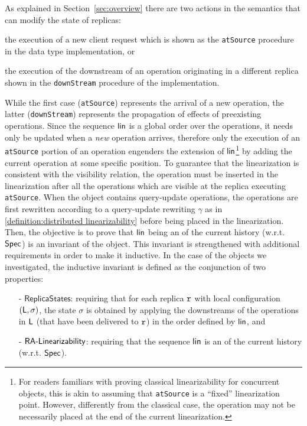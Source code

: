 As explained in Section~\ref{sec:overview} there are two actions in the
semantics that can modify the state of replicas:
\begin{inparaenum}
\item the execution of a new client request which is shown as the
  \lstinline|atSource| procedure in the data type implementation, or
\item the execution of the downstream of an operation originating in a
  different replica shown in the \lstinline|downStream| procedure of
  the implementation.
\end{inparaenum}
%
While the first case (\lstinline|atSource|) represents the arrival of
a new operation, the latter (\lstinline|downStream|) represents the
propagation of effects of preexisting operations.
%
Since the sequence $\mathsf{lin}$ is a global order over the operations,
it needs only be updated when a \emph{new} operation arrives,
therefore only the execution of an \lstinline|atSource| portion of an
operation engenders the extension of $\mathsf{lin}$\footnote{For readers
  familiars with proving classical linearizability for concurrent
  objects, this is akin to assuming that \lstinline|atSource| is a
  ``fixed'' linearization point.
  However, differently from the classical case, the operation may not
  be necessarily placed at the end of the current linearization.}
by adding the current operation at some specific position. To guarantee that the
linearization is consistent with the visibility relation, the operation must be inserted in
the linearization after all the operations which are visible at the replica executing \lstinline|atSource|.
When the object contains query-update operations, the operations are first rewritten according to a query-update rewriting $\gamma$ as in \autoref{definition:distributed linearizability} before being placed in the linearization.
Then, the objective is to prove that $\mathsf{lin}$ being an
\crdtlinearization{} of the current history (w.r.t. $\mathsf{Spec}{}$) is an
invariant of the object. This invariant is strengthened with
additional requirements in order to make it inductive.
%
In the case of the objects we investigated, the inductive invariant is
defined as the conjunction of two properties:
\begin{itemize}
\item[-] $\mathsf{ReplicaStates}$: requiring that for each replica
  $\mathtt{r}$ with local configuration $(\mathsf{L},\sigma)$, the state
  $\sigma$ is obtained by applying the downstreams of the operations
  in $\mathsf{L}$ (that have been delivered to $\mathtt{r}$) in the order
  defined by $\mathsf{lin}$, and
\item[-] $\mathsf{RA\text{-}Linearizability{}}$: requiring that the sequence
  $\mathsf{lin}$ is an \crdtlinearization{} of the current history (w.r.t.
  $\mathsf{Spec}{}$).
\end{itemize}
